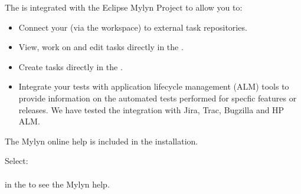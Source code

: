 The \ite{} is integrated with the Eclipse Mylyn Project to allow you to:
\begin{itemize}
\item Connect your \ite{} (via the workspace) to external task repositories.
\item View, work on and edit tasks directly in the \ite{}.
\item Create tasks directly in the \ite{}.
\item Integrate your tests with application lifecycle management (ALM) tools to provide information on the automated tests performed for specfic features or releases. We have tested the integration with Jira, Trac, Bugzilla and HP ALM. 
\end{itemize}

The Mylyn online help is included in the installation. 

Select:\\
 \\
in the \ite{} to see the Mylyn help. 
